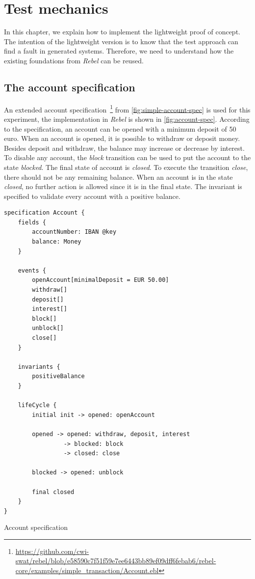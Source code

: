 \chapter{Test mechanics}\label{sec:ch3}

In this chapter, we explain how to implement the lightweight proof of concept. The intention of the lightweight version is to know that the test approach can find a fault in generated systems. Therefore, we need to understand how the existing foundations from \textit{Rebel} can be reused.

\section{The account specification}
An extended account specification~\footnote{\url{https://github.com/cwi-swat/rebel/blob/e58590c7f51f59e7ee6443bb89ef09dff6febab6/rebel-core/examples/simple_transaction/Account.ebl}} from \autoref{fig:simple-account-spec} is used for this experiment, the implementation in \textit{Rebel} is shown in \autoref{fig:account-spec}. According to the specification, an account can be opened with a minimum deposit of 50 euro. When an account is opened, it is possible to withdraw or deposit money. Besides deposit and withdraw, the balance may increase or decrease by interest. To disable any account, the \textit{block} transition can be used to put the account to the state \textit{blocked}. The final state of account is \textit{closed}. To execute the transition \textit{close}, there should not be any remaining balance. When an account is in the state \textit{closed}, no further action is allowed since it is in the final state. The invariant is specified to validate every account with a positive balance.

\begin{sourcecode}[h!]
\begin{lstlisting}[]
specification Account {
	fields {
		accountNumber: IBAN @key
		balance: Money
	}

	events {
		openAccount[minimalDeposit = EUR 50.00]
		withdraw[]
		deposit[]
		interest[]
		block[]
		unblock[]
		close[]
	}

	invariants {
		positiveBalance
	}

	lifeCycle {
		initial init -> opened: openAccount

		opened -> opened: withdraw, deposit, interest
			     -> blocked: block
			     -> closed: close

		blocked -> opened: unblock

		final closed
	}
}
\end{lstlisting}
\caption{Account specification}\label{fig:account-spec}
\end{sourcecode}
\FloatBarrier


